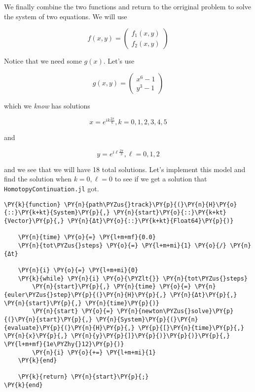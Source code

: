 \documentclass[11pt]{article}
\begin{document}
We finally combine the two functions and return to the orriginal problem
to solve the system of two equations. We will use

\[
f(x, y) = \begin{pmatrix} f_1(x,y) \\ f_2(x, y) \end{pmatrix}
\]

Notice that we need some \(g(x)\). Let's use

\[
g(x, y) = \begin{pmatrix} x^6 - 1 \\ y^3 - 1 \end{pmatrix}
\]

which we \emph{know} has solutions

\[
    x = e^{ik\frac{2\pi}{6}}, k = 0,1,2,3,4,5
\]

and

\[
    y = e^{i\ell\frac{2\pi}{3}}, \ell = 0,1,2
\]

and we see that we will have 18 total solutions. Let's implement this
model and find the solution when \(k = 0, \ell = 0\) to see if we get a
solution that \texttt{HomotopyContinuation.jl} got.

    \begin{tcolorbox}[breakable, size=fbox, boxrule=1pt, pad at break*=1mm,colback=cellbackground, colframe=cellborder]
\begin{Verbatim}[commandchars=\\\{\}]
\PY{k}{function} \PY{n}{path\PYZus{}track}\PY{p}{(}\PY{n}{H}\PY{o}{::}\PY{k+kt}{System}\PY{p}{,} \PY{n}{start}\PY{o}{::}\PY{k+kt}{Vector}\PY{p}{,} \PY{n}{Δt}\PY{o}{::}\PY{k+kt}{Float64}\PY{p}{)}

    \PY{n}{time} \PY{o}{=} \PY{l+m+mf}{0.0}
    \PY{n}{tot\PYZus{}steps} \PY{o}{=} \PY{l+m+mi}{1} \PY{o}{/} \PY{n}{Δt}

    \PY{n}{i} \PY{o}{=} \PY{l+m+mi}{0}
    \PY{k}{while} \PY{n}{i} \PY{o}{\PYZlt{}} \PY{n}{tot\PYZus{}steps}
        \PY{n}{start}\PY{p}{,} \PY{n}{time} \PY{o}{=} \PY{n}{euler\PYZus{}step}\PY{p}{(}\PY{n}{H}\PY{p}{,} \PY{n}{Δt}\PY{p}{,} \PY{n}{start}\PY{p}{,} \PY{n}{time}\PY{p}{)}
        \PY{n}{start} \PY{o}{=} \PY{n}{newton\PYZus{}solve}\PY{p}{(}\PY{n}{start}\PY{p}{,} \PY{n}{System}\PY{p}{(}\PY{n}{evaluate}\PY{p}{(}\PY{n}{H}\PY{p}{,} \PY{p}{[}\PY{n}{time}\PY{p}{,} \PY{n}{x}\PY{p}{,} \PY{n}{y}\PY{p}{]}\PY{p}{)}\PY{p}{)}\PY{p}{,} \PY{l+m+mf}{1e\PYZhy{}12}\PY{p}{)}
        \PY{n}{i} \PY{o}{+=} \PY{l+m+mi}{1}
    \PY{k}{end}

    \PY{k}{return} \PY{n}{start}\PY{p}{;} 
\PY{k}{end}
\end{Verbatim}
\end{tcolorbox}
\end{document}
